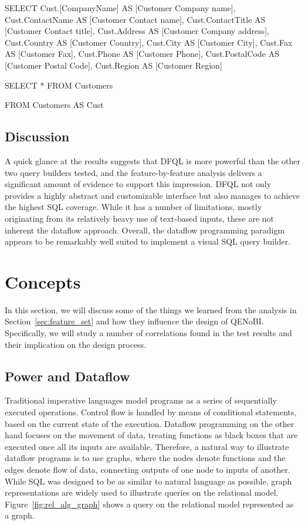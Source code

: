 \documentclass[11pt,a4paper]{globis-book}
\begin{document}
\begin{codeex}[caption=``Bloated'' query generated by EasyQuery, label=lst:read_easyquery]
SELECT Cust.[CompanyName] AS [Customer Company name],
  Cust.ContactName AS [Customer Contact name],
  Cust.ContactTitle AS [Customer Contact title],
  Cust.Address AS [Customer Company address],
  Cust.Country AS [Customer Country],
  Cust.City AS [Customer City],
  Cust.Fax AS [Customer Fax],
  Cust.Phone AS [Customer Phone],
  Cust.PostalCode AS [Customer Postal Code],
  Cust.Region AS [Customer Region] 
\end{codeex}
\begin{codeex}[caption=Concise query generated by ExtJS, label=lst:read_extjs]
SELECT *
FROM Customers
\end{codeex}
FROM Customers AS Cust

\subsection{Discussion}
A quick glance at the results suggests that DFQL is more powerful than the other two query builders tested, and the feature-by-feature analysis delivers a significant amount of evidence to support this impression. DFQL not only provides a highly abstract and customizable interface but also manages to achieve the highest SQL coverage. While it has a number of limitations, mostly originating from its relatively heavy use of text-based inputs, these are not inherent the dataflow approach. Overall, the dataflow programming paradigm appears to be remarkably well suited to implement a visual SQL query builder.

\section{Concepts}
\label{sec:concepts}
In this section, we will discuss some of the things we learned from the analysis in Section~\ref{sec:feature_set} and how they influence the design of QENoBI. Specifically, we will study a number of correlations found in the test results and their implication on the design process.

\subsection{Power and Dataflow}
\label{sec:pow_df}
Traditional imperative languages model programs as a series of sequentially executed operations. Control flow is handled by means of conditional statements, based on the current state of the execution. Dataflow programming on the other hand focuses on the movement of data, treating functions as black boxes that are executed once all its inputs are available. Therefore, a natural way to illustrate dataflow programs is to use graphs, where the nodes denote functions and the edges denote flow of data, connecting outputs of one node to inputs of another. While SQL was designed to be as similar to natural language as possible, graph representations are widely used to illustrate queries on the relational model. Figure~\ref{fig:rel_alg_graph} shows a query on the relational model represented as a graph.
\end{document}
